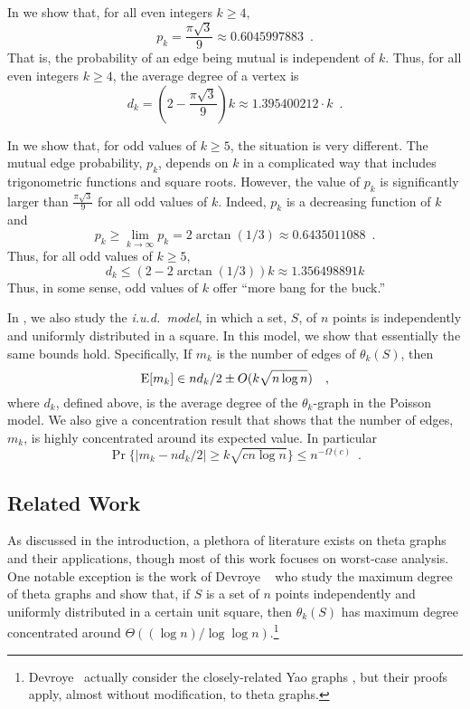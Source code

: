 \documentclass[twoside,leqno,twocolumn]{article}
\begin{document}
In  we show that, for all even integers $k\ge 4$,
\[
    p_k=\frac{\pi\sqrt{3}}{9}\approx 0.6045997883 \enspace .
\]
That is, the probability of an edge being mutual is independent of
$k$. Thus, for all even integers $k\ge 4$, the average degree of a
vertex is
\[
  d_k = \left(2-\frac{\pi\sqrt{3}}{9}\right)k \approx 1.395400212\cdot k \enspace .
\]

In  we show that, for odd values of $k\ge 5$, the situation
is very different.  The mutual edge probability, $p_k$, depends on
$k$ in a complicated way that includes trigonometric functions and
square roots.  However, the value of $p_k$ is significantly larger than
$\frac{\pi\sqrt{3}}{9}$ for all odd values of $k$.  Indeed, $p_k$ is a
decreasing function of $k$ and
\[
  p_k\ge \lim_{k\to\infty} p_k = 2\arctan(1/3)\approx 0.6435011088 \enspace .
\]
Thus, for all odd values of $k\ge 5$,
\[
   d_k \le (2-2\arctan(1/3))k \approx 1.356498891 k
\]
Thus, in some sense, odd values of $k$ offer ``more bang for the buck.''

In , we also study the \emph{i.u.d.\ model}, in which a
set, $S$, of $n$ points is independently and uniformly distributed in
a square.  In this model, we show that essentially the same bounds hold.
Specifically, If $m_k$ is the number of edges of $\theta_k(S)$, then
\[
    \mathrm{E}[m_k] \in nd_k/2\pm O(k\sqrt{n\log n}) \enspace \enspace ,
\]
where $d_k$, defined above, is the average degree of the $\theta_k$-graph
in the Poisson model.  We also give a concentration result that shows
that the number of edges, $m_k$, is highly concentrated around its
expected value.  In particular
\[
    \Pr\{|m_k - nd_k/2| \ge k\sqrt{cn\log n}\} \le n^{-\Omega(c)} \enspace .
\]

\subsection{Related Work}

As discussed in the introduction, a plethora of literature exists on
theta graphs and their applications, though most of this work focuses on
worst-case analysis.  One notable exception is the work of Devroye \etal\
\cite{devroye.gudmundsson.ea:on} who study the maximum degree of theta
graphs and show that, if $S$ is a set of $n$ points independently and
uniformly distributed in a certain unit square, then $\theta_k(S)$
has maximum degree concentrated around $\Theta((\log n)/\log\log
n)$.\footnote{Devroye \etal\ actually consider the closely-related Yao graphs
\cite{flinchbaugh.jones:strong,yao:on}, but their proofs apply,
almost without modification, to theta graphs.}
\end{document}
